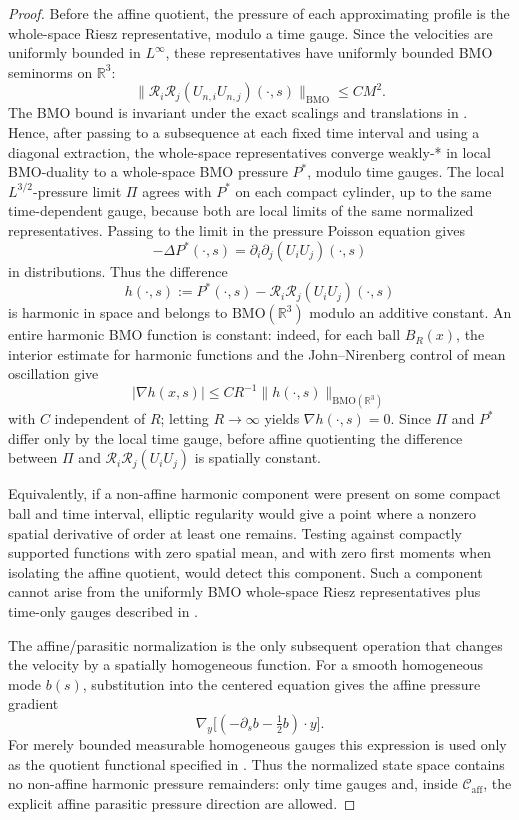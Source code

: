 \documentclass[11pt]{amsart}
\numberwithin{equation}{section}
\theoremstyle{plain}
\theoremstyle{definition}
\theoremstyle{remark}
\newcommand{\Caff}{\mathcal C_{\mathrm{aff}}}
\begin{document}
\begin{proof}
Before the affine quotient, the pressure of each approximating profile is the
whole-space Riesz representative, modulo a time gauge.  Since the velocities
are uniformly bounded in \(L^\infty\), these representatives have uniformly
bounded BMO seminorms on \(\mathbb R^3\):
\[
   \|\mathcal R_i\mathcal R_j(U_{n,i}U_{n,j})(\cdot,s)\|_{\mathrm{BMO}}
   \le C M^2 .
\]
The BMO bound is invariant under the exact scalings and translations in
.  Hence, after passing to a
subsequence at each fixed time interval and using a diagonal extraction, the
whole-space representatives converge weakly-* in local BMO-duality to a
whole-space BMO pressure \(P^\ast\), modulo time gauges.  The local
\(L^{3/2}\)-pressure limit \(\Pi\) agrees with \(P^\ast\) on each compact
cylinder, up to the same time-dependent gauge, because both are local limits of
the same normalized representatives.  Passing to the limit in the pressure
Poisson equation gives
\[
   -\Delta P^\ast(\cdot,s)
   =
   \partial_i\partial_j(U_iU_j)(\cdot,s)
\]
in distributions.  Thus the difference
\[
   h(\cdot,s):=P^\ast(\cdot,s)-\mathcal R_i\mathcal R_j(U_iU_j)(\cdot,s)
\]
is harmonic in space and belongs to \(\mathrm{BMO}(\mathbb R^3)\) modulo an
additive constant.  An entire harmonic BMO function is constant: indeed, for
each ball \(B_R(x)\), the interior estimate for harmonic functions and the
John--Nirenberg control of mean oscillation give
\[
   |\nabla h(x,s)|
   \le
   C R^{-1}\|h(\cdot,s)\|_{\mathrm{BMO}(\mathbb R^3)}
\]
with \(C\) independent of \(R\); letting \(R\to\infty\) yields
\(\nabla h(\cdot,s)=0\).  Since \(\Pi\) and \(P^\ast\) differ only by the local
time gauge, before affine quotienting the difference between \(\Pi\) and
\(\mathcal R_i\mathcal R_j(U_iU_j)\) is spatially constant.

Equivalently, if a non-affine harmonic component were present on some compact
ball and time interval, elliptic regularity would give a point where a
nonzero spatial derivative of order at least one remains.  Testing against
compactly supported functions with zero spatial mean, and with zero first
moments when isolating the affine quotient, would detect this component.  Such
a component cannot arise from the uniformly BMO whole-space Riesz
representatives plus time-only gauges described in
.

The affine/parasitic normalization is the only subsequent operation that
changes the velocity by a spatially homogeneous function.  For a smooth
homogeneous mode \(b(s)\), substitution into the centered equation gives the
affine pressure gradient
\[
   \nabla_y\bigl[(-\partial_s b-\tfrac12 b)\cdot y\bigr].
\]
For merely bounded measurable homogeneous gauges this expression is used only
as the quotient functional specified in
.
Thus the normalized state space contains no non-affine harmonic pressure
remainders: only time gauges and, inside \(\Caff\), the explicit affine
parasitic pressure direction are allowed.
\end{proof}
\end{document}
